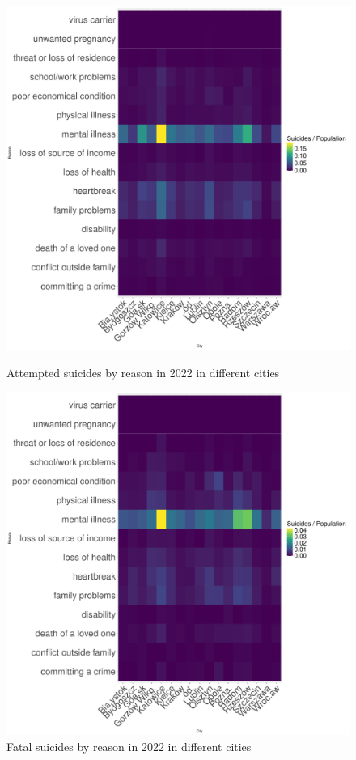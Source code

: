 \documentclass{article}
\begin{document}
\begin{figure}[H]
    \centering
    \begin{minipage}{0.65\textwidth}
        \includegraphics[width=\textwidth]{imgs/reason_city_op-att-2022.pdf}
        \caption{Attempted suicides by reason  in 2022 in different cities}
	\label{fig:reason_city_op-att-2022}
    \end{minipage}
    \hfill
    \begin{minipage}{0.65\textwidth}
        \includegraphics[width=\textwidth]{imgs/reason_city_op-fat-2022.pdf}
        \caption{Fatal suicides by reason  in 2022 in different cities}
	\label{fig:reason_city_op-fat-2022}
    \end{minipage}
\end{figure}
\end{document}
